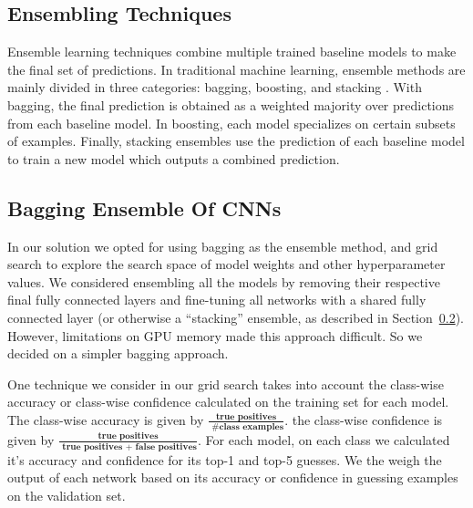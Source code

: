 \subsection{Ensembling Techniques}

Ensemble learning techniques combine multiple trained baseline models to make the final set of predictions.  In traditional machine learning, ensemble methods are mainly divided in three categories: bagging, boosting, and stacking \cite{ensembleML2012}.  With bagging, the final prediction is obtained as a weighted majority over predictions from each baseline model.  In boosting, each model specializes on certain subsets of examples.  Finally, stacking ensembles use the prediction of each baseline model to train a new model which outputs a combined prediction.

\subsection{Bagging Ensemble Of CNNs}
\label{ss:ensembling}

In our solution we opted for using bagging as the ensemble method, and grid search to explore the search space of model weights and other hyperparameter values. We considered ensembling all the models by removing their respective final fully connected layers and fine-tuning all networks with a shared fully connected layer (or otherwise a ``stacking'' ensemble, as described in Section~\ref{ss:ensembling}). However, limitations on GPU memory made this approach difficult. So we decided on a simpler bagging approach.

One technique we consider in our grid search takes into account the class-wise accuracy or class-wise confidence calculated on the training set for each model. The class-wise accuracy is given by $\frac{\textbf{true positives}}{\textbf{ \# class examples}}$. the class-wise confidence is given by $\frac{\textbf{true positives}}{\textbf{ true positives + false positives}}$. For each model, on each class we calculated it's accuracy and confidence for its top-1 and top-5 guesses. We the weigh the output of each network based on its accuracy or confidence in guessing examples on the validation set.